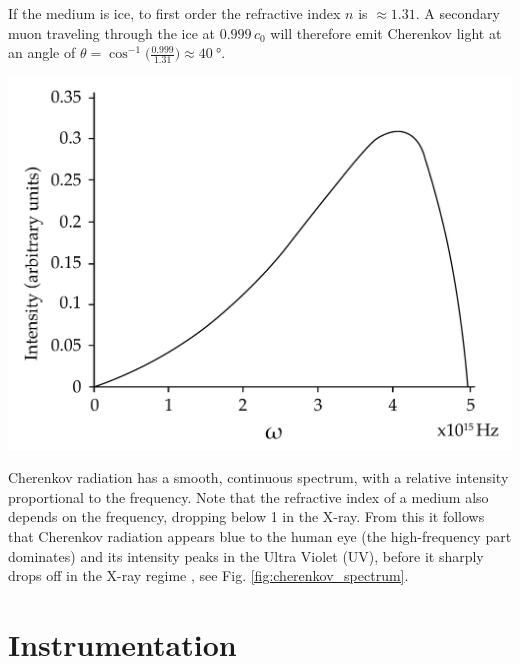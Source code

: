 \documentclass[
    a4paper, %
    fontsize=10pt, %
    twoside=false, %
    numbers=noenddot, %
    fontmethod=tex,
]{kaobook}
\begin{document}
If the medium is ice, to first order the refractive index $n$ is $\approx1.31$. A secondary muon traveling through the ice at $0.999\,c_0$ will therefore emit Cherenkov light at an angle of $\theta = \cos^{-1}{\big(\frac{0.999}{1.31}\big)} \approx \SI{40}{\degree}$. 
\begin{marginfigure}
    \includegraphics{ic/ic_cherenkov_spectrum.pdf}
    \caption[Cherenkov spectrum]{Cherenkov spectrum for a particle with $v=0.8 \,c_0$ in water. The intensity peaks at $\SI{4e15}{\Hz}$, corresponding to a wavelength of \SI{75}{\nm}, lying at the high-frequency end of the UV spectrum. Adapted from \cite{Fulop1992}.}
\end{marginfigure}
Cherenkov radiation has a smooth, continuous spectrum, with a relative intensity proportional to the frequency. Note that the refractive index of a medium also depends on the frequency, dropping below 1 in the X-ray. From this it follows that Cherenkov radiation appears blue to the human eye (the high-frequency part dominates) and its intensity peaks in the Ultra Violet (UV), before it sharply drops off in the X-ray regime , see Fig. \ref{fig:cherenkov_spectrum}.

\section{Instrumentation}
\end{document}
